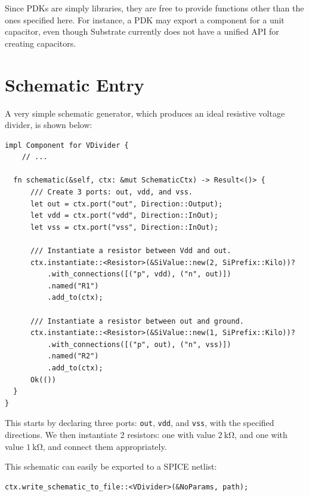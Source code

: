 Since PDKs are simply libraries, they are free to provide functions other than the ones specified here.
For instance, a PDK may export a component for a unit capacitor, even though Substrate currently does not
have a unified API for creating capacitors.

\section{Schematic Entry}

A very simple schematic generator, which produces an ideal resistive voltage divider, is shown below:

\begin{verbatim}
impl Component for VDivider {
    // ...
    
  fn schematic(&self, ctx: &mut SchematicCtx) -> Result<()> {
      /// Create 3 ports: out, vdd, and vss.
      let out = ctx.port("out", Direction::Output);
      let vdd = ctx.port("vdd", Direction::InOut);
      let vss = ctx.port("vss", Direction::InOut);

      /// Instantiate a resistor between Vdd and out.
      ctx.instantiate::<Resistor>(&SiValue::new(2, SiPrefix::Kilo))?
          .with_connections([("p", vdd), ("n", out)])
          .named("R1")
          .add_to(ctx);

      /// Instantiate a resistor between out and ground.
      ctx.instantiate::<Resistor>(&SiValue::new(1, SiPrefix::Kilo))?
          .with_connections([("p", out), ("n", vss)])
          .named("R2")
          .add_to(ctx);
      Ok(())
  }
}
\end{verbatim}

This starts by declaring three ports: \verb|out|, \verb|vdd|, and \verb|vss|, with the specified directions.
We then instantiate 2 resistors: one with value $\SI{2}{\kilo\ohm}$, and one with value $\SI{1}{\kilo\ohm}$,
and connect them appropriately.

This schematic can easily be exported to a SPICE netlist:

\begin{verbatim}
ctx.write_schematic_to_file::<VDivider>(&NoParams, path);
\end{verbatim}

